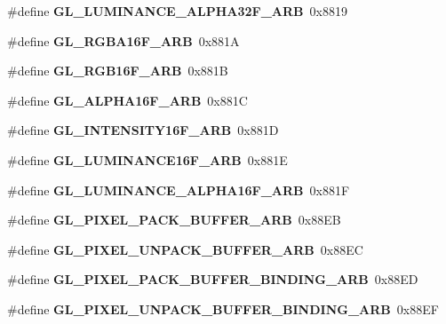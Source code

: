 \begin{DoxyCompactItemize}
\item 
\#define {\bfseries G\+L\+\_\+\+L\+U\+M\+I\+N\+A\+N\+C\+E\+\_\+\+A\+L\+P\+H\+A32\+F\+\_\+\+A\+R\+B}~0x8819\label{_s_d_l__opengl_8h_a1fb1f84c9be7b4cf74fb292f8c6ab6d9}

\item 
\#define {\bfseries G\+L\+\_\+\+R\+G\+B\+A16\+F\+\_\+\+A\+R\+B}~0x881\+A\label{_s_d_l__opengl_8h_a1d69388cec3ce265e2f930a9c7e301ac}

\item 
\#define {\bfseries G\+L\+\_\+\+R\+G\+B16\+F\+\_\+\+A\+R\+B}~0x881\+B\label{_s_d_l__opengl_8h_ab34cb055682a1d0e64279bd6ca903b3b}

\item 
\#define {\bfseries G\+L\+\_\+\+A\+L\+P\+H\+A16\+F\+\_\+\+A\+R\+B}~0x881\+C\label{_s_d_l__opengl_8h_a310fadd77b050c6165b6fcb049d3c453}

\item 
\#define {\bfseries G\+L\+\_\+\+I\+N\+T\+E\+N\+S\+I\+T\+Y16\+F\+\_\+\+A\+R\+B}~0x881\+D\label{_s_d_l__opengl_8h_af7197b53e101d8dd3a6d5fceb2f630d0}

\item 
\#define {\bfseries G\+L\+\_\+\+L\+U\+M\+I\+N\+A\+N\+C\+E16\+F\+\_\+\+A\+R\+B}~0x881\+E\label{_s_d_l__opengl_8h_ab79b1e21bd4be95824b40330a306cda6}

\item 
\#define {\bfseries G\+L\+\_\+\+L\+U\+M\+I\+N\+A\+N\+C\+E\+\_\+\+A\+L\+P\+H\+A16\+F\+\_\+\+A\+R\+B}~0x881\+F\label{_s_d_l__opengl_8h_a25b310abccb0a2787dad339bb157e5c8}

\item 
\#define {\bfseries G\+L\+\_\+\+P\+I\+X\+E\+L\+\_\+\+P\+A\+C\+K\+\_\+\+B\+U\+F\+F\+E\+R\+\_\+\+A\+R\+B}~0x88\+E\+B\label{_s_d_l__opengl_8h_a33442ed4126f53a339ac7061baf89435}

\item 
\#define {\bfseries G\+L\+\_\+\+P\+I\+X\+E\+L\+\_\+\+U\+N\+P\+A\+C\+K\+\_\+\+B\+U\+F\+F\+E\+R\+\_\+\+A\+R\+B}~0x88\+E\+C\label{_s_d_l__opengl_8h_af287830aa9785013826e3bb81b2365bc}

\item 
\#define {\bfseries G\+L\+\_\+\+P\+I\+X\+E\+L\+\_\+\+P\+A\+C\+K\+\_\+\+B\+U\+F\+F\+E\+R\+\_\+\+B\+I\+N\+D\+I\+N\+G\+\_\+\+A\+R\+B}~0x88\+E\+D\label{_s_d_l__opengl_8h_a5fdcb9cc7488e9fafd3e1faf11cf6cde}

\item 
\#define {\bfseries G\+L\+\_\+\+P\+I\+X\+E\+L\+\_\+\+U\+N\+P\+A\+C\+K\+\_\+\+B\+U\+F\+F\+E\+R\+\_\+\+B\+I\+N\+D\+I\+N\+G\+\_\+\+A\+R\+B}~0x88\+E\+F\label{_s_d_l__opengl_8h_ab3b78d5b517fd0da0268c69e8aec4f52}


\end{DoxyCompactItemize}
